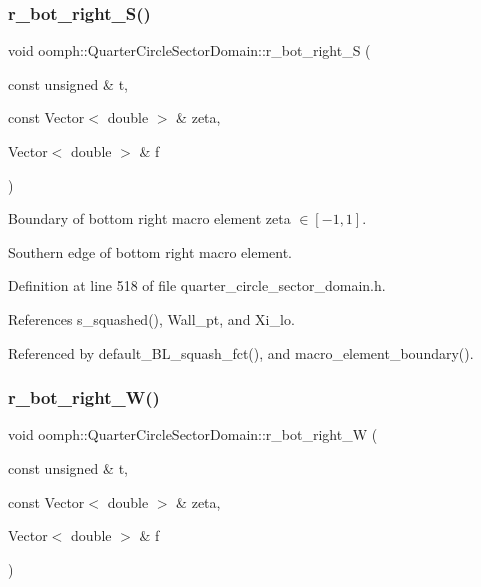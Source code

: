 \mbox{\label{classoomph_1_1QuarterCircleSectorDomain_a552f9bfc6fd451669f44ee02c8bb0d38}} 
\subsubsection{\texorpdfstring{r\+\_\+bot\+\_\+right\+\_\+\+S()}{r\_bot\_right\_S()}}
{\footnotesize\ttfamily void oomph\+::\+Quarter\+Circle\+Sector\+Domain\+::r\+\_\+bot\+\_\+right\+\_\+S (\begin{DoxyParamCaption}\item[{const unsigned \&}]{t,  }\item[{const Vector$<$ double $>$ \&}]{zeta,  }\item[{Vector$<$ double $>$ \&}]{f }\end{DoxyParamCaption})\hspace{0.3cm}{\ttfamily [private]}}



Boundary of bottom right macro element zeta $ \in [-1,1] $. 

Southern edge of bottom right macro element. 

Definition at line 518 of file quarter\+\_\+circle\+\_\+sector\+\_\+domain.\+h.



References s\+\_\+squashed(), Wall\+\_\+pt, and Xi\+\_\+lo.



Referenced by default\+\_\+\+B\+L\+\_\+squash\+\_\+fct(), and macro\+\_\+element\+\_\+boundary().

\mbox{\label{classoomph_1_1QuarterCircleSectorDomain_a85ba295aaeff2833644691978deac247}} 
\subsubsection{\texorpdfstring{r\+\_\+bot\+\_\+right\+\_\+\+W()}{r\_bot\_right\_W()}}
{\footnotesize\ttfamily void oomph\+::\+Quarter\+Circle\+Sector\+Domain\+::r\+\_\+bot\+\_\+right\+\_\+W (\begin{DoxyParamCaption}\item[{const unsigned \&}]{t,  }\item[{const Vector$<$ double $>$ \&}]{zeta,  }\item[{Vector$<$ double $>$ \&}]{f }\end{DoxyParamCaption})\hspace{0.3cm}{\ttfamily [private]}}



